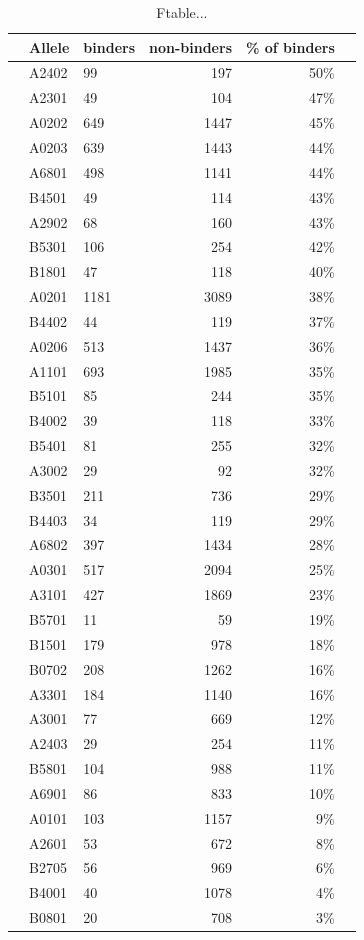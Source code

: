 \begin{table}[ht]
\begin{center}
\begin{tabular}{rllrrr}
\hline
 & Allele	&	 binders & non-binders & \% of binders \\
\hline
 & A2402	&	99	&	197	&	50\%	\\
 & A2301	&	49	&	104	&	47\%	\\
 & A0202	&	649	&	1447	&	45\%	\\
 & A0203	&	639	&	1443	&	44\%	\\
 & A6801	&	498	&	1141	&	44\%	\\
 & B4501	&	49	&	114	&	43\%	\\
 & A2902	&	68	&	160	&	43\%	\\
 & B5301	&	106	&	254	&	42\%	\\
 & B1801	&	47	&	118	&	40\%	\\
 & A0201	&	1181	&	3089	&	38\%	\\
 & B4402	&	44	&	119	&	37\%	\\
 & A0206	&	513	&	1437	&	36\%	\\
 & A1101	&	693	&	1985	&	35\%	\\
 & B5101	&	85	&	244	&	35\%	\\
 & B4002	&	39	&	118	&	33\%	\\
 & B5401	&	81	&	255	&	32\%	\\
 & A3002	&	29	&	92	&	32\%	\\
 & B3501	&	211	&	736	&	29\%	\\
 & B4403	&	34	&	119	&	29\%	\\
 & A6802	&	397	&	1434	&	28\%	\\
 & A0301	&	517	&	2094	&	25\%	\\
 & A3101	&	427	&	1869	&	23\%	\\
 & B5701	&	11	&	59	&	19\%	\\
 & B1501	&	179	&	978	&	18\%	\\
 & B0702	&	208	&	1262	&	16\%	\\
 & A3301	&	184	&	1140	&	16\%	\\
 & A3001	&	77	&	669	&	12\%	\\
 & A2403	&	29	&	254	&	11\%	\\
 & B5801	&	104	&	988	&	11\%	\\
 & A6901	&	86	&	833	&	10\%	\\
 & A0101	&	103	&	1157	&	9\%	\\
 & A2601	&	53	&	672	&	8\%	\\
 & B2705	&	56	&	969	&	6\%	\\
 & B4001	&	40	&	1078	&	4\%	\\
 & B0801	&	20	&	708	&	3\%	\\
\hline
\end{tabular}
\caption{Ftable...}\label{ftable}
\end{center}
\end{table}

